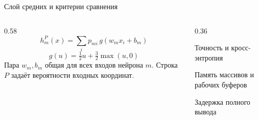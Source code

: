 \documentclass[aspectratio=169,11pt]{beamer}
\begin{document}
\begin{frame}[t]{Слой средних и критерии сравнения}
\slidebody
\begin{columns}[T,onlytextwidth]
\begin{column}{0.58\textwidth}
\[
 h_m^P(x)=\sum_i p_{mi}\,g(w_mx_i+b_m)
\]
\[
 g(u)=\tfrac12u+\tfrac32\max(u,0)
\]
Пара $w_m,b_m$ общая для всех входов нейрона $m$.
Строка $P$ задаёт вероятности входных координат.
\end{column}
\begin{column}{0.36\textwidth}
\par\vspace{0.15cm}
Точность и кросс-энтропия\par\vspace{0.2cm}
Память массивов и рабочих буферов\par\vspace{0.2cm}
Задержка полного вывода
\end{column}
\end{columns}
\vspace{0.32cm}
\end{frame}
\end{document}
